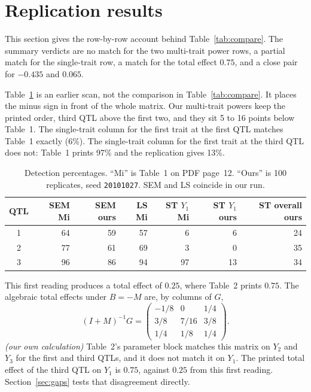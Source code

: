 \documentclass[11pt]{article}
\newcommand{\ev}[1]{\textup{\emph{(#1)}}}
\begin{document}
\section{Replication results}

This section gives the row-by-row account behind Table~\ref{tab:compare}.
The summary verdicts are no match for the two multi-trait power rows, a
partial match for the single-trait row, a match for the total effect $0.75$,
and a close pair for $-0.435$ and $0.065$.

Table~\ref{tab:power} is an earlier scan, not the comparison in
Table~\ref{tab:compare}. It places the minus sign in front of the whole
matrix. Our multi-trait powers
keep the printed order, third QTL above the first two, and they sit 5 to 16
points below Table~1. The single-trait column for the first trait at the
first QTL matches Table~1 exactly (6\%). The single-trait column for the
first trait at the third QTL does not: Table~1 prints 97\% and the
replication gives 13\%.

\begin{table}[ht]
\centering
\caption{Detection percentages. ``Mi'' is Table~1 on PDF page~12. ``Ours''
is 100 replicates, seed \texttt{20101027}. SEM and LS coincide in our run.}
\label{tab:power}
\begin{tabular}{crrrrrr}
\hline
QTL & SEM Mi & SEM ours & LS Mi & ST $Y_1$ Mi & ST $Y_1$ ours & ST overall ours \\
\hline
1 & 64 & 59 & 57 & 6 & 6 & 24 \\
2 & 77 & 61 & 69 & 3 & 0 & 35 \\
3 & 96 & 86 & 94 & 97 & 13 & 34 \\
\hline
\end{tabular}
\end{table}

This first reading produces a total effect of $0.25$, where Table~2 prints $0.75$. The algebraic total effects under $B=-M$ are, by columns of $G$,
\[
(I+M)^{-1}G
=\begin{pmatrix}-1/8&0&1/4\\ 3/8&7/16&3/8\\ 1/4&1/8&1/4\end{pmatrix}.
\]
\ev{our own calculation}
Table~2's parameter block matches this matrix on $Y_2$ and $Y_3$ for the
first and third QTLs, and it does not match it on $Y_1$. The printed total
effect of the third QTL on $Y_1$ is $0.75$, against $0.25$ from this first
reading. Section~\ref{sec:gaps} tests that disagreement directly.
\end{document}
